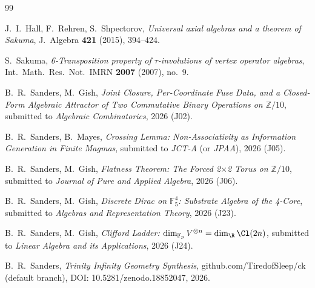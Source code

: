 \documentclass[11pt,reqno]{amsart}
\theoremstyle{plain}
\theoremstyle{definition}
\theoremstyle{remark}
\newcommand{\Z}{\mathbb{Z}}
\newcommand{\F}{\mathbb{F}}
\begin{document}
\begin{thebibliography}{99}

 J.~I.~Hall, F.~Rehren,
S.~Shpectorov, \emph{Universal axial algebras and a theorem of Sakuma},
J.~Algebra \textbf{421} (2015), 394--424.

 S.~Sakuma,
\emph{6-Transposition property of $\tau$-involutions of vertex operator
algebras},
Int.~Math.~Res.~Not.~IMRN \textbf{2007} (2007), no.~9.

 B.~R.~Sanders, M.~Gish,
\emph{Joint Closure, Per-Coordinate Fuse Data, and a Closed-Form
Algebraic Attractor of Two Commutative Binary Operations on
$\Z/10$}, submitted to \emph{Algebraic Combinatorics}, 2026 (J02).

 B.~R.~Sanders, B.~Mayes,
\emph{Crossing Lemma: Non-Associativity as Information Generation in
Finite Magmas}, submitted to \emph{JCT-A} (or \emph{JPAA}), 2026 (J05).

 B.~R.~Sanders, M.~Gish,
\emph{Flatness Theorem: The Forced 2$\times$2 Torus on $\Z/10$},
submitted to \emph{Journal of Pure and Applied Algebra}, 2026 (J06).

 B.~R.~Sanders, M.~Gish,
\emph{Discrete Dirac on $\F_5^4$: Substrate Algebra of the 4-Core},
submitted to \emph{Algebras and Representation Theory}, 2026 (J23).

 B.~R.~Sanders, M.~Gish,
\emph{Clifford Ladder: $\dim_{\F_p} V^{\otimes n} = \dim_\R \Cl(2n)$},
submitted to \emph{Linear Algebra and its Applications}, 2026 (J24).

 B.~R.~Sanders,
\emph{Trinity Infinity Geometry Synthesis},
github.com/TiredofSleep/ck (default branch),
DOI: 10.5281/zenodo.18852047, 2026.

\end{thebibliography}
\end{document}
